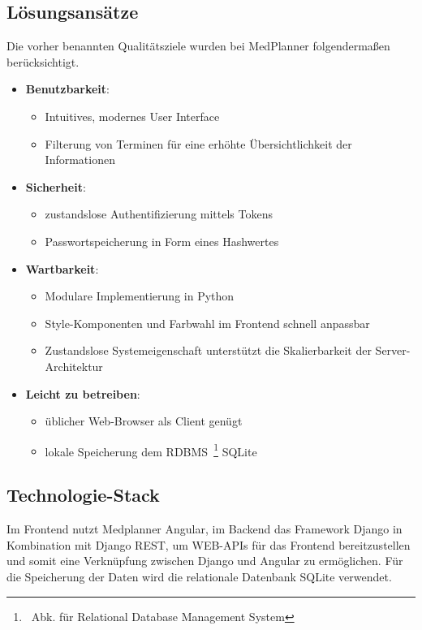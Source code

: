 \documentclass[conference]{IEEEtran}
\begin{document}
\subsection{Lösungsansätze}
Die vorher benannten Qualitätsziele wurden bei MedPlanner folgendermaßen berücksichtigt.
\begin{itemize}
	\item \textbf{Benutzbarkeit}:
	\begin{itemize}
		\item Intuitives, modernes User Interface
		\item Filterung von Terminen für eine erhöhte Übersichtlichkeit der Informationen
	\end{itemize}
	\pagebreak
	\item \textbf{Sicherheit}:
	\begin{itemize}
		\item zustandslose Authentifizierung mittels Tokens
		\item Passwortspeicherung in Form eines Hashwertes
	\end{itemize}
	\item \textbf{Wartbarkeit}:
	\begin{itemize}
		\item Modulare Implementierung in Python
		\item Style-Komponenten und Farbwahl im Frontend schnell anpassbar
		\item Zustandslose Systemeigenschaft unterstützt die Skalierbarkeit der Server-Architektur
	\end{itemize}
	\item \textbf{Leicht zu betreiben}:
	\begin{itemize}
		\item üblicher Web-Browser als Client genügt
		\item lokale Speicherung dem RDBMS~\footnote{~Abk. für Relational Database Management System} SQLite
	\end{itemize}	
\end{itemize}

\subsection{Technologie-Stack}
Im Frontend nutzt Medplanner Angular, im Backend das Framework Django in Kombination mit Django REST, um WEB-APIs für das Frontend bereitzustellen und somit eine Verknüpfung zwischen Django und Angular zu ermöglichen. Für die Speicherung der Daten wird die relationale Datenbank SQLite verwendet. 
\end{document}
